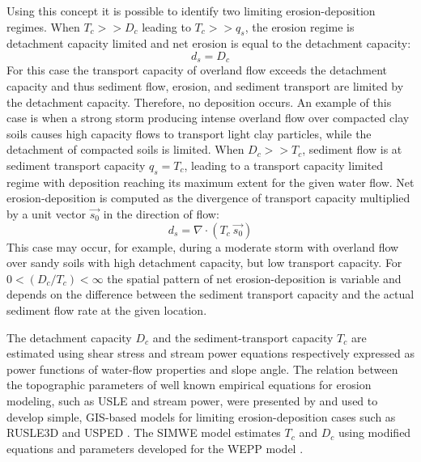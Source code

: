 \documentclass[gmd, manuscript]{copernicus}
\begin{document}
Using this concept it is possible to identify 
two limiting erosion-deposition regimes.
When $T_c >> D_c$ leading to $T_c >> q_s$, 
the erosion regime is detachment capacity limited and
net erosion is equal to the detachment capacity:
\begin{equation}
\label{eq:detachment_limited}
 d_s = D_c
\end{equation}
For this case the transport capacity of overland flow 
exceeds the detachment capacity 
and thus sediment flow, erosion, and sediment transport
are limited by the detachment capacity. 
Therefore, no deposition occurs.
An example of this case is when a strong storm 
producing intense %
overland flow over compacted clay soils 
causes high capacity flows to transport light clay particles,
while the detachment of compacted soils is limited.
%
When $D_c >> T_c$, sediment flow is at sediment transport capacity $q_s = T_c$, 
leading to a transport capacity limited regime 
with deposition reaching its maximum extent for the given water flow. 
Net erosion-deposition is computed as the divergence of
transport capacity multiplied by a unit vector $\vec{s_0}$ 
in the direction of flow:
\begin{equation}
\label{eq:transport_limited}
 d_s = \nabla\cdot (T_c ~ \vec{s_0})
\end{equation}
This case may occur, for example, during a moderate storm 
with overland flow over sandy soils 
with high detachment capacity, but low transport capacity.
%
For $0 < ({D_c / T_c}) < \infty$ 
the spatial pattern of net erosion-deposition is variable 
and depends on the difference between the sediment transport capacity 
and the actual sediment flow rate at the given location.

The detachment capacity $D_c $  and the sediment-transport capacity $T_c $  
are estimated using shear stress and stream power equations respectively
expressed as power functions of water-flow properties and slope angle.    
The relation between the topographic parameters 
of well known empirical equations for erosion modeling, 
such as USLE and stream power, were presented by \citep{Moore1986} 
and used to develop simple, GIS-based models for limiting erosion-deposition cases 
such as RUSLE3D and USPED \citep{Mitasova2001}.
The SIMWE model estimates $T_c$ and $D_c$ using modified 
equations and parameters developed for the WEPP model 
\citep{Flanagan2013,Mitasova2001}.
\end{document}
